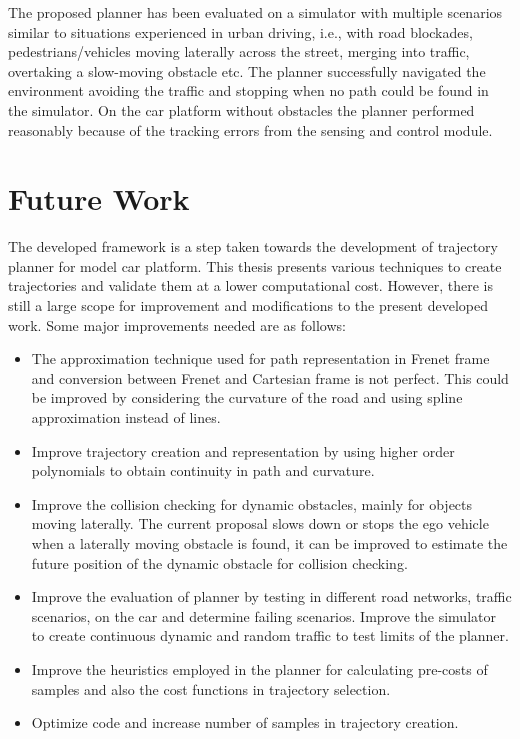 The proposed planner has been evaluated on a simulator with multiple scenarios similar to situations experienced in urban driving, i.e., with road blockades, pedestrians/vehicles moving laterally across the street, merging into traffic, overtaking a slow-moving obstacle etc. The planner successfully navigated the environment avoiding the traffic and stopping when no path could be found in the simulator. On the car platform without obstacles the planner performed reasonably because of the tracking errors from the sensing and control module.

\section{Future Work}
The developed framework is a step taken towards the development of trajectory planner for model car platform. This thesis presents various techniques to create trajectories and validate them at a lower computational cost. However, there is still a large scope for improvement and modifications to the present developed work. Some major improvements needed are as follows:

\begin{itemize}
	\item The approximation technique used for path representation in Frenet frame and conversion between Frenet and Cartesian frame is not perfect. This could be improved by considering the curvature of the road and using spline approximation instead of lines.
	\item Improve trajectory creation and representation by using higher order polynomials to obtain continuity in path and curvature.
	\item Improve the collision checking for dynamic obstacles, mainly for objects moving laterally. The current proposal slows down or stops the ego vehicle when a laterally moving obstacle is found, it can be improved to estimate the future position of the dynamic obstacle for collision checking.
	\item Improve the evaluation of planner by testing in different road networks, traffic scenarios, on the car and determine failing scenarios. Improve the simulator to create continuous dynamic and random traffic to test limits of the planner.
	\item Improve the heuristics employed in the planner for calculating pre-costs of samples and also the cost functions in trajectory selection.
	\item Optimize code and increase number of samples in trajectory creation.
	
\end{itemize}



